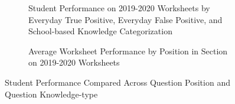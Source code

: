 {\begin{figure}
     \centering
     \begin{subfigure}{0.49\textwidth}
        \caption{Student Performance on 2019-2020 \ts Worksheets by Everyday True Positive, Everyday False Positive, and School-based Knowledge Categorization}
        \label{fig:everyday_school}
    \end{subfigure}
    \begin{subfigure}{0.49\textwidth}
        \caption{Average Worksheet Performance by Position in Section on 2019-2020 \ts Worksheets}
        \label{fig:position_es}
    \end{subfigure}
    
    \caption{Student Performance Compared Across Question Position and Question Knowledge-type}
\end{figure}

}
